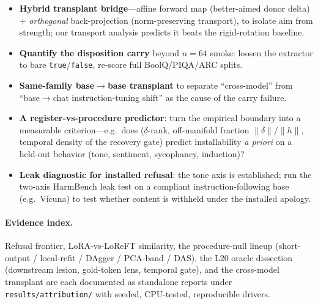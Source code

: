 \documentclass{article}
\begin{document}
\begin{itemize}
  \item \textbf{Hybrid transplant bridge}---affine forward map (better-aimed donor delta) +
  \emph{orthogonal} back-projection (norm-preserving transport), to isolate aim from strength; our
  transport analysis predicts it beats the rigid-rotation baseline.
  \item \textbf{Quantify the disposition carry} beyond $n{=}64$ smoke: loosen the extractor to bare
  \texttt{true}/\texttt{false}, re-score full BoolQ/PIQA/ARC splits.
  \item \textbf{Same-family base$\to$base transplant} to separate ``cross-model'' from
  ``base$\to$chat instruction-tuning shift'' as the cause of the carry failure.
  \item \textbf{A register-vs-procedure predictor}: turn the empirical boundary into a measurable
  criterion---e.g.\ does ($\delta$-rank, off-manifold fraction $\lVert\delta\rVert/\lVert h\rVert$,
  temporal density of the recovery gate) predict installability \emph{a priori} on a held-out behavior
  (tone, sentiment, sycophancy, induction)?
  \item \textbf{Leak diagnostic for installed refusal}: the tone axis is established; run the two-axis
  HarmBench leak test on a compliant instruction-following base (e.g.\ Vicuna) to test whether content
  is withheld under the installed apology.
\end{itemize}

\paragraph{Evidence index.} Refusal frontier, LoRA-vs-LoReFT similarity, the procedure-null lineup
(short-output / local-refit / DAgger / PCA-band / DAS), the L20 oracle dissection (downstream lesion,
gold-token lens, temporal gate), and the cross-model transplant are each documented as standalone
reports under \texttt{results/attribution/} with seeded, CPU-tested, reproducible drivers.
\end{document}
